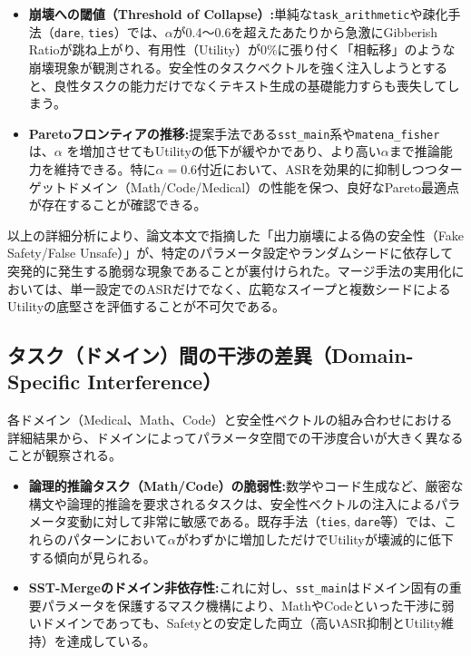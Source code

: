 \documentclass{article}
\begin{document}
\begin{itemize}
    \item \textbf{崩壊への閾値（Threshold of Collapse）:}単純な\texttt{task\_arithmetic}や疎化手法（\texttt{dare}, \texttt{ties}）では、$\alpha$が0.4〜0.6を超えたあたりから急激にGibberish Ratioが跳ね上がり、有用性（Utility）が0\%に張り付く「相転移」のような崩壊現象が観測される。安全性のタスクベクトルを強く注入しようとすると、良性タスクの能力だけでなくテキスト生成の基礎能力すらも喪失してしまう。
    \item \textbf{Paretoフロンティアの推移:}提案手法である\texttt{sst\_main}系や\texttt{matena\_fisher}は、$\alpha$ を増加させてもUtilityの低下が緩やかであり、より高い$\alpha$まで推論能力を維持できる。特に$\alpha=0.6$付近において、ASRを効果的に抑制しつつターゲットドメイン（Math/Code/Medical）の性能を保つ、良好なPareto最適点が存在することが確認できる。
\end{itemize}

以上の詳細分析により、論文本文で指摘した「出力崩壊による偽の安全性（Fake Safety/False Unsafe）」が、特定のパラメータ設定やランダムシードに依存して突発的に発生する脆弱な現象であることが裏付けられた。マージ手法の実用化においては、単一設定でのASRだけでなく、広範なスイープと複数シードによるUtilityの底堅さを評価することが不可欠である。

\subsection{タスク（ドメイン）間の干渉の差異（Domain-Specific Interference）}
各ドメイン（Medical、Math、Code）と安全性ベクトルの組み合わせにおける詳細結果から、ドメインによってパラメータ空間での干渉度合いが大きく異なることが観察される。
\begin{itemize}
    \item \textbf{論理的推論タスク（Math/Code）の脆弱性:}数学やコード生成など、厳密な構文や論理的推論を要求されるタスクは、安全性ベクトルの注入によるパラメータ変動に対して非常に敏感である。既存手法（\texttt{ties}, \texttt{dare}等）では、これらのパターンにおいて$\alpha$がわずかに増加しただけでUtilityが壊滅的に低下する傾向が見られる。
    \item \textbf{SST-Mergeのドメイン非依存性:}これに対し、\texttt{sst\_main}はドメイン固有の重要パラメータを保護するマスク機構により、MathやCodeといった干渉に弱いドメインであっても、Safetyとの安定した両立（高いASR抑制とUtility維持）を達成している。
\end{itemize}
\end{document}
